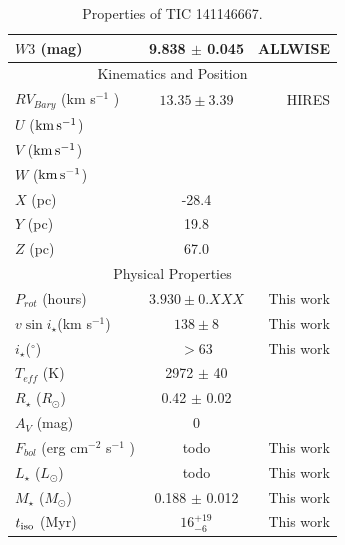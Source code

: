 \documentclass{nature3}
\newcommand{\starname}{TIC 141146667}
\newcommand{\kms}{\ensuremath{\rm km\,s^{-1}}}
\begin{document}
\begin{methods}
\begin{table}
\begin{tabular}{lcr}
    $W3$ (mag)                      &  9.838 $\pm$ 0.045 & ALLWISE   \\
    \hline
    \multicolumn{3}{c}{Kinematics and Position} \\
    \hline
    $RV_{Bary}$ (km s$^{-1}$ ) & $13.35 \pm 3.39$ & HIRES \\
    $U$ (\kms) & & \\
    $V$ (\kms) & & \\
    $W$ (\kms) & & \\
    $X$ (pc) & -28.4 & \\
    $Y$ (pc) &  19.8 & \\
    $Z$ (pc) &  67.0 & \\
    \hline
    \multicolumn{3}{c}{Physical Properties} \\
    \hline
    $P_{rot}$ (hours) & $3.930 \pm 0.XXX$ & This work \\ 
    $v \sin i_\star$(km s$^{-1}$) & $138 \pm 8$ & This work\\
    $i_\star$($^\circ$) & $>$63 & This work \\
    $T_{eff}$ (K) & 2972 $\pm$ 40 & \cite{Bouma2024}\\
    $R_\star$ ($R_{\odot}$) & 0.42 $\pm$ 0.02 & \cite{Bouma2024} \\
    $A_V$ (mag) & 0 & \cite{Green2019} \\
    $F_{bol}$ (erg cm$^{-2}$ s$^{-1}$ ) & todo & This work\\
    $L_\star$ ($L_{\odot}$)  & todo & This work\\
    $M_\star$ ($M_{\odot}$)  & 0.188 $\pm$ 0.012  & This work\\
    $t_{\rm iso}$ (Myr) & $16^{+19}_{-6}$ &  This work \\
    \hline
    \end{tabular}
    \caption{Properties of \starname.}
    \label{tab:stellarParameters}
\end{table}



\end{methods}
\end{document}
